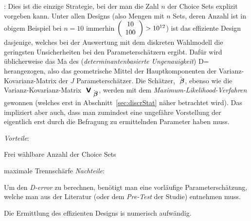 \vspace{1em}

\noindent
{}: Dies ist die einzige Strategie, bei der
man die Zahl $n$ der Choice Sets explizit vorgeben kann. Unter allen
 Designs (also Mengen mit $n$ Sets, deren Anzahl ist in obigem Beispiel bei
$n=10$ immerhin $\left(\begin{array}{c} 10 \\ 100 \end{array} \right) > 10^{12}$)
 ist das effiziente Design dasjenige, welches bei der Auswertung mit
 dem diskreten Wahlmodell die geringsten Unsicherheiten bei den
 Parametersch\"atzern ergibt. Daf\"ur wird \"ublicherweise das Ma\3 des
  (\emph{determinantenbasierte Ungenauigkeit})
\be
\label{D-error}
D=
\ee
herangezogen, also das geometrische Mittel der Hauptkomponenten der
Varianz-Ko\-va\-ri\-anz-Matrix der  $J$ Parametersch\"atzer. Die Sch\"atzer,
$\hat{{\mbox{ \boldmath {$\beta$}}}}$, ebenso wie die Varianz-Kovarianz-Matrix
${\mbox{ \sf\textbf{V}}}_{\hat{{\mbox{ \boldmath {$\beta$}}}}}$,  werden  mit dem
\emph{Maximum-Likelihood-Verfahren} gewonnen (welches erst 
 in Abschnitt~\ref{sec:discrStat} n\"aher betrachtet wird). Das
 impliziert aber auch, dass man zumindest eine ungef\"ahre Vorstellung
 der eigentlich erst durch die Befragung zu ermittelnden Parameter
 haben muss. 

\vspace{1ex}

\noindent
\textit{Vorteile}:
\bi
\item Frei w\"ahlbare Anzahl der Choice Sets
\item maximale Trennsch\"arfe
\ei
\textit{Nachteile}:
\bi
\item Um den \emph{D-error} zu berechnen, ben\"otigt man eine
  vorl\"aufige Parametersch\"atzung, welche man aus der Literatur
  (oder dem \emph{Pre-Test} der Studie) entnehmen muss.
\item Die Ermittlung des effizienten Designs is numerisch aufw\"andig.
\ei

